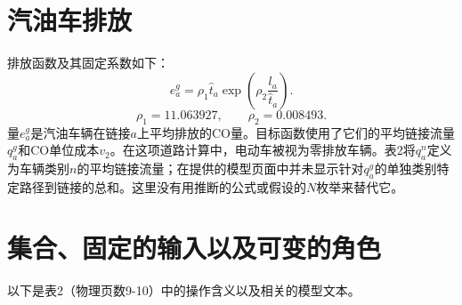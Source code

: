 \documentclass{article}
\begin{document}
\section*{汽油车排放}
排放函数及其固定系数如下：
\begin{equation}
e_a^g=\rho_1\hat t_a\exp\left(\rho_2\frac{l_a}{\hat t_a}\right).\tag{13}
\end{equation}
\[
\rho_1=11.063927,\qquad \rho_2=0.008493.
\]
量$e_a^g$是汽油车辆在链接$a$上平均排放的CO量。目标函数使用了它们的平均链接流量$q_a^g$和CO单位成本$v_2$。在这项道路计算中，电动车被视为零排放车辆。表2将$q_a^n$定义为车辆类别$n$的平均链接流量；在提供的模型页面中并未显示针对$q_a^g$的单独类别特定路径到链接的总和。这里没有用推断的公式或假设的$N$枚举来替代它。

\section*{集合、固定的输入以及可变的角色}
以下是表2（物理页数9-10）中的操作含义以及相关的模型文本。
\end{document}
